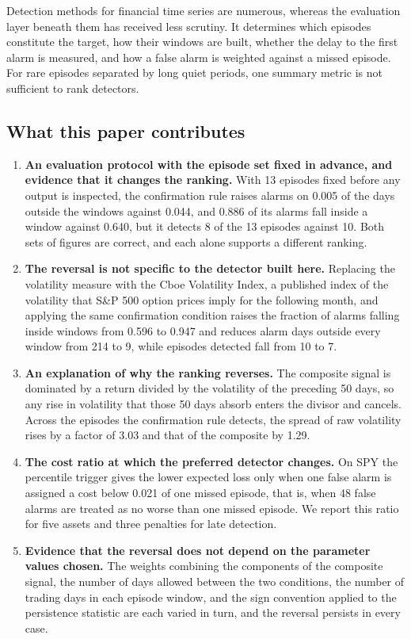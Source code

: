 \documentclass[pdflatex,sn-mathphys-num,iicol]{sn-jnl}
\begin{document}
Detection methods for financial time series are numerous, whereas the evaluation layer beneath them has received less scrutiny. It determines which episodes constitute the target, how their windows are built, whether the delay to the first alarm is measured, and how a false alarm is weighted against a missed episode. For rare episodes separated by long quiet periods, one summary metric is not sufficient to rank detectors.

\subsection*{What this paper contributes}
\begin{enumerate}
\item \textbf{An evaluation protocol with the episode set fixed in advance, and evidence that it changes the ranking.} With 13 episodes fixed before any output is inspected, the confirmation rule raises alarms on 0.005 of the days outside the windows against 0.044, and 0.886 of its alarms fall inside a window against 0.640, but it detects 8 of the 13 episodes against 10. Both sets of figures are correct, and each alone supports a different ranking.
\item \textbf{The reversal is not specific to the detector built here.} Replacing the volatility measure with the Cboe Volatility Index, a published index of the volatility that S\&P 500 option prices imply for the following month, and applying the same confirmation condition raises the fraction of alarms falling inside windows from 0.596 to 0.947 and reduces alarm days outside every window from 214 to 9, while episodes detected fall from 10 to 7.
\item \textbf{An explanation of why the ranking reverses.} The composite signal is dominated by a return divided by the volatility of the preceding 50 days, so any rise in volatility that those 50 days absorb enters the divisor and cancels. Across the episodes the confirmation rule detects, the spread of raw volatility rises by a factor of 3.03 and that of the composite by 1.29.
\item \textbf{The cost ratio at which the preferred detector changes.} On SPY the percentile trigger gives the lower expected loss only when one false alarm is assigned a cost below 0.021 of one missed episode, that is, when 48 false alarms are treated as no worse than one missed episode. We report this ratio for five assets and three penalties for late detection.
\item \textbf{Evidence that the reversal does not depend on the parameter values chosen.} The weights combining the components of the composite signal, the number of days allowed between the two conditions, the number of trading days in each episode window, and the sign convention applied to the persistence statistic are each varied in turn, and the reversal persists in every case.
\end{enumerate}
\end{document}
